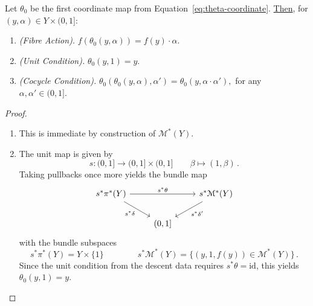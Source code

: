 \documentclass[a4paper, 11pt,reqno]{amsart}
\newcommand{\id}{\mathrm{id}}
\newcommand{\M}{\mathcal{M}}
\begin{document}
\begin{observation}\label{obs:theta-descent-prop} Let $\theta_0$ be the first coordinate map from Equation~\eqref{eq:theta-coordinate}. \underline{Then}, for $(y,\alpha)\in Y\times (0,1]$:
	\begin{enumerate}[label=(\roman*)]
		\item \textit{(Fibre Action). } $f(\theta_0(y,\alpha))=f(y)\cdot\alpha$.
		\item \textit{(Unit Condition). } $\theta_0(y,1)=y.$
		\item \textit{(Cocycle Condition). } $\theta_0(\theta_0(y,\alpha),\alpha')=\theta_0(y,\alpha\cdot \alpha'),$ for any $\alpha,\alpha'\in (0,1]$.
	\end{enumerate}
\end{observation}
\begin{proof}\begin{enumerate}[label=(\roman*):] 
		\item This is immediate by construction of $\M^\ast(Y)$.
		\item The unit map is given by 
		$$s\colon  (0,1]\longrightarrow (0,1]\times (0,1]\qquad \beta\longmapsto (1,\beta)\,.$$
		Taking pullbacks once more yields the bundle map
		\begin{equation*} %
		\begin{tikzcd} s^\ast \pi^*(Y) \ar[rr,"s^\ast\theta"] \ar[dr,swap, "s^\ast \delta"] && s^\ast \M^*(Y) \ar[dl,"s^\ast\delta'"]\\
		& (0,1]
		\end{tikzcd}
		\end{equation*}
		with the bundle subspaces%
		$$s^\ast \pi^\ast (Y)=Y\times \{1\}\qquad \qquad s^\ast \M^\ast(Y)=\{(y,1,f(y))\in \M^\ast(Y) \}\,.$$
		Since the unit condition from the descent data requires $s^\ast\theta=\id$, this yields $\theta_0(y,1)=y$.
		

\end{enumerate}
\end{proof}
\end{document}
